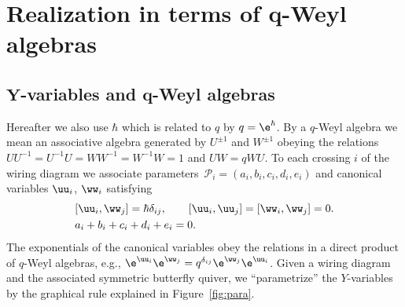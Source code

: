 \section[Realization in terms of q-Weyl algebras]{Realization in terms of $\boldsymbol{q}$-Weyl algebras}\label{s:qw}

\subsection[Y-variables and q-Weyl algebras]{$\boldsymbol{Y}$-variables and $\boldsymbol{q}$-Weyl algebras}

Hereafter we also use $\hbar $ which is related to $q$ by
$q=\e^\hbar$. By a $q$-Weyl algebra we mean an associative algebra
generated by $U^{\pm 1}$ and $W^{\pm 1}$ obeying the relations
$U U^{-1} = U^{-1} U= W W^{-1} = W^{-1}W = 1$ and $UW = q WU$.
%
To each crossing $i$ of the wiring diagram we associate parameters~${\mathscr{P}_i = (a_i, b_i, c_i, d_i, e_i)}$ and canonical variables
$\uu_i$, $\ww_i$ satisfying
\begin{align}
&[\uu_i, \ww_j]= \hbar \delta_{ij}, \qquad [\uu_i, \uu_j]=[\ww_i, \ww_j]=0.
\label{uwh}
\\
&a_i+b_i+c_i+d_i+e_i=0.
\label{ae0}
\end{align}
The exponentials of the canonical variables obey the relations in a
direct product of $q$-Weyl algebras, e.g.,
$\e^{\uu_i} \e^{\ww_j} = q^{\delta_{ij}}\e^{\ww_j}\e^{\uu_i}$. Given a wiring
diagram and the associated symmetric butterfly quiver, we
``parametrize'' the $Y$-variables by the graphical rule explained in
Figure~\ref{fig:para}.

